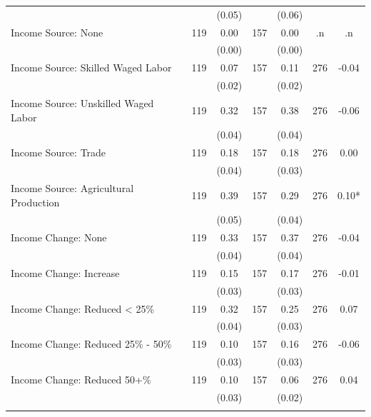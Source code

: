 \begin{tabular}{@{\extracolsep{5pt}}lcccccc}
 &   & (0.05)  &   & (0.06)  &   &  \\ [1ex]
Income Source: None   & 119    & 0.00    & 157    & 0.00    & .n    & .n   \\
 &   & (0.00)  &   & (0.00)  &   &  \\ [1ex]
Income Source: Skilled Waged Labor   & 119    & 0.07    & 157    & 0.11    & 276    & -0.04   \\
 &   & (0.02)  &   & (0.02)  &   &  \\ [1ex]
Income Source: Unskilled Waged Labor   & 119    & 0.32    & 157    & 0.38    & 276    & -0.06   \\
 &   & (0.04)  &   & (0.04)  &   &  \\ [1ex]
Income Source: Trade   & 119    & 0.18    & 157    & 0.18    & 276    & 0.00   \\
 &   & (0.04)  &   & (0.03)  &   &  \\ [1ex]
Income Source: Agricultural Production   & 119    & 0.39    & 157    & 0.29    & 276    & 0.10*   \\
 &   & (0.05)  &   & (0.04)  &   &  \\ [1ex]
Income Change: None   & 119    & 0.33    & 157    & 0.37    & 276    & -0.04   \\
 &   & (0.04)  &   & (0.04)  &   &  \\ [1ex]
Income Change: Increase   & 119    & 0.15    & 157    & 0.17    & 276    & -0.01   \\
 &   & (0.03)  &   & (0.03)  &   &  \\ [1ex]
Income Change: Reduced < 25\%   & 119    & 0.32    & 157    & 0.25    & 276    & 0.07   \\
 &   & (0.04)  &   & (0.03)  &   &  \\ [1ex]
Income Change: Reduced 25\% - 50\%   & 119    & 0.10    & 157    & 0.16    & 276    & -0.06   \\
 &   & (0.03)  &   & (0.03)  &   &  \\ [1ex]
Income Change: Reduced 50+\%   & 119    & 0.10    & 157    & 0.06    & 276    & 0.04   \\
 &   & (0.03)  &   & (0.02)  &   &  \\ [1ex]
\hline \hline \\[-1.8ex]

\end{tabular}
